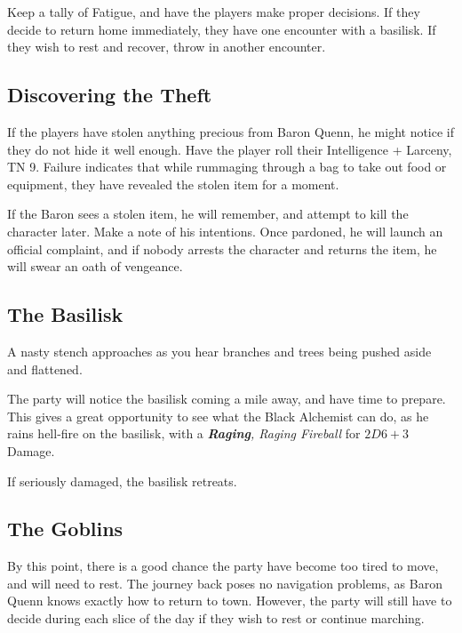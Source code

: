 \begin{multicols}{2}

\noindent
Keep a tally of Fatigue, and have the players make proper decisions.
If they decide to return home immediately, they have one encounter with a basilisk.
If they wish to rest and recover, throw in another encounter.

\subsection{Discovering the Theft}

If the players have stolen anything precious from Baron Quenn, he might notice if they do not hide it well enough.
Have the player roll their Intelligence + Larceny, TN 9.
Failure indicates that while rummaging through a bag to take out food or equipment, they have revealed the stolen item for a moment.

If the Baron sees a stolen item, he will remember, and attempt to kill the character later.
Make a note of his intentions.
Once pardoned, he will launch an official complaint, and if nobody arrests the character and returns the item, he will swear an oath of vengeance.

\subsection{The Basilisk}

\begin{boxtext}

	A nasty stench approaches as you hear branches and trees being pushed aside and flattened.

\end{boxtext}

The party will notice the basilisk coming a mile away, and have time to prepare.
This gives a great opportunity to see what the Black Alchemist can do, as he rains hell-fire on the basilisk, with a \textit{\textbf{Raging}, Raging Fireball} for $2D6+3$ Damage.

\basilisk

If seriously damaged, the basilisk retreats.

\subsection{The Goblins}

By this point, there is a good chance the party have become too tired to move, and will need to rest.
The journey back poses no navigation problems, as Baron Quenn knows exactly how to return to town.
However, the party will still have to decide during each slice of the day if they wish to rest or continue marching.

\end{multicols}
